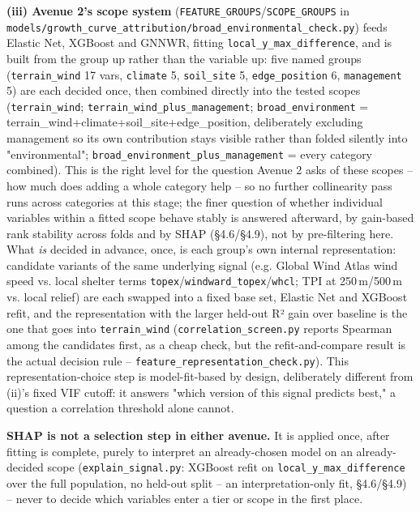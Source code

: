 \documentclass[11pt,a4paper]{report}
\begin{document}
\textbf{(iii) Avenue 2's scope system} (\texttt{FEATURE\_GROUPS}/\texttt{SCOPE\_GROUPS} in
\texttt{models/growth\_curve\_attribution/broad\_environmental\_check.py}) feeds Elastic Net,
XGBoost and GNNWR, fitting \texttt{local\_y\_max\_difference}, and is built from the group up
rather than the variable up: five named groups (\texttt{terrain\_wind} 17 vars,
\texttt{climate} 5, \texttt{soil\_site} 5, \texttt{edge\_position} 6, \texttt{management} 5) are
each decided once, then combined directly into the tested scopes
(\texttt{terrain\_wind}; \texttt{terrain\_wind\_plus\_management}; \texttt{broad\_environment} =
terrain\_wind+climate+soil\_site+edge\_position, deliberately excluding management so its own
contribution stays visible rather than folded silently into "environmental";
\texttt{broad\_environment\_plus\_management} = every category combined). This is the right level
for the question Avenue 2 asks of these scopes -- how much does adding a whole category help --
so no further collinearity pass runs across categories at this stage; the finer question of
whether individual variables within a fitted scope behave stably is answered afterward, by
gain-based rank stability across folds and by SHAP (\S4.6/\S4.9), not by pre-filtering here.
What \emph{is} decided in advance, once, is each group's own internal representation: candidate
variants of the same underlying signal (e.g. Global Wind Atlas wind speed vs. local shelter
terms \texttt{topex}/\texttt{windward\_topex}/\texttt{whcl}; TPI at 250\,m/500\,m vs. local
relief) are each swapped into a fixed base set, Elastic Net and XGBoost refit, and the
representation with the larger held-out R² gain over baseline is the one that goes into
\texttt{terrain\_wind} (\texttt{correlation\_screen.py} reports Spearman among the candidates
first, as a cheap check, but the refit-and-compare result is the actual decision rule --
\texttt{feature\_representation\_check.py}). This representation-choice step is model-fit-based
by design, deliberately different from (ii)'s fixed VIF cutoff: it answers "which version of
this signal predicts best," a question a correlation threshold alone cannot.

\textbf{SHAP is not a selection step in either avenue.} It is applied once, after fitting is
complete, purely to interpret an already-chosen model on an already-decided scope
(\texttt{explain\_signal.py}: XGBoost refit on \texttt{local\_y\_max\_difference} over the full
population, no held-out split -- an interpretation-only fit, \S4.6/\S4.9) -- never to decide which
variables enter a tier or scope in the first place.
\end{document}
